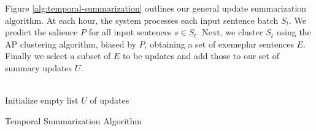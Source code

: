 
Figure \ref{alg:temporal-summarization} outlines our general update
summarization algorithm.  At each hour, the system processes each input 
sentence batch $S_t$.
We predict the salience $P$ for all input sentences $s\in S_t$.
Next, we cluster $S_t$ using the AP clustering algorithm, biased by $P$,
obtaining a set of exemeplar sentences $E$. Finally we select a subset of $E$
to be updates and add those to our set of summary updates $U$.

\begin{algorithm}%
 ~\\
 Initialize empty list $U$ of updates\\
 \caption{Temporal Summarization Algorithm}\label{alg:temporal-summarization}
\end{algorithm}

